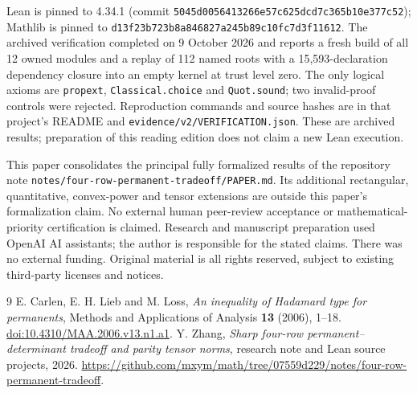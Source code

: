 \documentclass[11pt]{article}
\begin{document}
Lean is pinned to 4.34.1 (commit
\nolinkurl{5045d0056413266e57c625dcd7c365b10e377c52}); Mathlib is pinned to
\nolinkurl{d13f23b723b8a846827a245b89c10fc7d3f11612}.
The archived verification completed on 9 October 2026 and reports a
fresh build of all 12 owned modules and a replay of 112 named roots with
a 15,593-declaration dependency closure into an empty kernel at trust
level zero. The only logical axioms are \texttt{propext},
\texttt{Classical.choice} and \texttt{Quot.sound}; two invalid-proof
controls were rejected. Reproduction commands and source hashes are in
that project's README and \texttt{evidence/v2/VERIFICATION.json}.
These are archived results; preparation of this reading edition does
not claim a new Lean execution.

This paper consolidates the principal fully formalized results of the
repository note \texttt{notes/four-row-permanent-tradeoff/PAPER.md}.
Its additional rectangular, quantitative, convex-power and tensor
extensions are outside this paper's formalization claim. No external
human peer-review acceptance or mathematical-priority certification is
claimed. Research and manuscript preparation used OpenAI AI assistants;
the author is responsible for the stated claims. There was no external
funding. Original material is all rights reserved, subject to existing
third-party licenses and notices.

\begin{thebibliography}{9}
 E. Carlen, E. H. Lieb and M. Loss,
\emph{An inequality of Hadamard type for permanents},
Methods and Applications of Analysis \textbf{13} (2006), 1--18.
\href{https://doi.org/10.4310/MAA.2006.v13.n1.a1}{doi:10.4310/MAA.2006.v13.n1.a1}.
 Y. Zhang,
\emph{Sharp four-row permanent--determinant tradeoff and parity tensor norms},
research note and Lean source projects, 2026.
\url{https://github.com/mxym/math/tree/07559d229/notes/four-row-permanent-tradeoff}.
\end{thebibliography}
\end{document}
